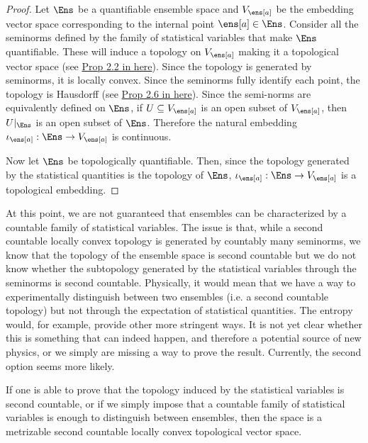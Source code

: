 \begin{mathSection}
\begin{proof}
	Let $\Ens$ be a quantifiable ensemble space and $V_{\ens[a]}$ be the embedding vector space corresponding to the internal point $\ens[a] \in \Ens$. Consider all the seminorms defined by the family of statistical variables that make $\Ens$ quantifiable. These will induce a topology on $V_{\ens[a]}$ making it a topological vector space (see \href{https://personal.math.ubc.ca/~cass/research/pdf/TVS.pdf}{Prop 2.2 in here}). Since the topology is generated by seminorms, it is locally convex. Since the seminorms fully identify each point, the topology is Hausdorff (see \href{https://personal.math.ubc.ca/~cass/research/pdf/TVS.pdf}{Prop 2.6 in here}). Since the semi-norms are equivalently defined on $\Ens$, if $U \subseteq V_{\ens[a]}$ is an open subset of $V_{\ens[a]}$, then $U \vert_{\Ens}$ is an open subset of $\Ens$. Therefore the natural embedding $\iota_{\ens[a]}:\Ens\to V_{\ens[a]}$ is continuous.
	
	Now let $\Ens$ be topologically quantifiable. Then, since the topology generated by the statistical quantities is the topology of $\Ens$, $\iota_{\ens[a]}:\Ens\to V_{\ens[a]}$ is a topological embedding. 
\end{proof}
\end{mathSection}

At this point, we are not guaranteed that ensembles can be characterized by a countable family of statistical variables. The issue is that, while a second countable locally convex topology is generated by countably many seminorms, we know that the topology of the ensemble space is second countable but we do not know whether the subtopology generated by the statistical variables through the seminorms is second countable. Physically, it would mean that we have a way to experimentally distinguish between two ensembles (i.e. a second countable topology) but not through the expectation of statistical quantities. The entropy would, for example, provide other more stringent ways. It is not yet clear whether this is something that can indeed happen, and therefore a potential source of new physics, or we simply are missing a way to prove the result. Currently, the second option seems more likely.

If one is able to prove that the topology induced by the statistical variables is second countable, or if we simply impose that a countable family of statistical variables is enough to distinguish between ensembles, then the space is a metrizable second countable locally convex topological vector space.

